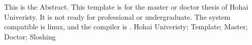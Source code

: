 %
{%
    This is the Abstract. This template is for the master or doctor thesis of Hohai Univeristy. It is not ready for professional or undergraduate.
    The system compatible is linux, and the compiler is \LaTeXe .
}%
{%
    Hohai Univeristy; Template; Master; Doctor; Sloshing
}